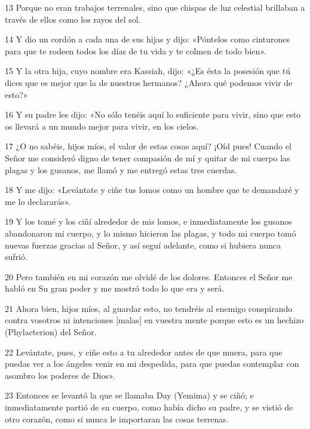 \par 13 Porque no eran trabajos terrenales, sino que chispas de luz celestial brillaban a través de ellos como los rayos del sol.

\par 14 Y dio un cordón a cada una de sus hijas y dijo: «Póntelos como cinturones para que te rodeen todos los días de tu vida y te colmen de todo bien».

\par 15 Y la otra hija, cuyo nombre era Kassiah, dijo: «¿Es ésta la posesión que tú dices que es mejor que la de nuestros hermanos? ¿Ahora qué podemos vivir de esto?»

\par 16 Y su padre les dijo: «No sólo tenéis aquí lo suficiente para vivir, sino que esto os llevará a un mundo mejor para vivir, en los cielos.

\par 17 ¿O no sabéis, hijos míos, el valor de estas cosas aquí? ¡Oíd pues! Cuando el Señor me consideró digno de tener compasión de mí y quitar de mi cuerpo las plagas y los gusanos, me llamó y me entregó estas tres cuerdas.

\par 18 Y me dijo: «Levántate y ciñe tus lomos como un hombre que te demandaré y me lo declararás».

\par 19 Y los tomé y los ciñí alrededor de mis lomos, e inmediatamente los gusanos abandonaron mi cuerpo, y lo mismo hicieron las plagas, y todo mi cuerpo tomó nuevas fuerzas gracias al Señor, y así seguí adelante, como si hubiera nunca sufrió.

\par 20 Pero también en mi corazón me olvidé de los dolores. Entonces el Señor me habló en Su gran poder y me mostró todo lo que era y será.

\par 21 Ahora bien, hijos míos, al guardar esto, no tendréis al enemigo conspirando contra vosotros ni intenciones [malas] en vuestra mente porque esto es un hechizo (Phylacterion) del Señor.

\par 22 Levántate, pues, y ciñe esto a tu alrededor antes de que muera, para que puedas ver a los ángeles venir en mi despedida, para que puedas contemplar con asombro los poderes de Dios».

\par 23 Entonces se levantó la que se llamaba Day (Yemima) y se ciñó; e inmediatamente partió de su cuerpo, como había dicho su padre, y se vistió de otro corazón, como si nunca le importaran las cosas terrenas.

